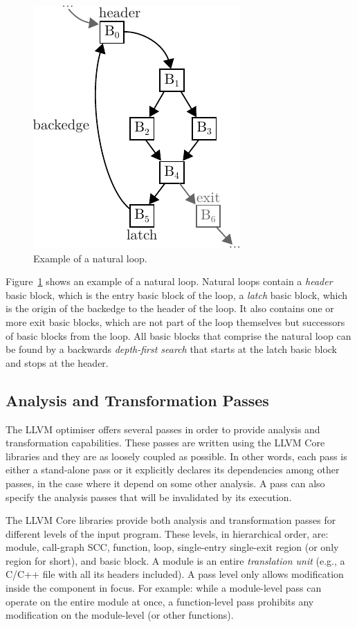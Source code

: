 \begin{figure}[h]
  \centering
  \includegraphics[scale=1]{figs/natural-loop.pdf}
  \caption{Example of a natural loop.}
  \label{fig:natural-loops}
\end{figure}

Figure~\ref{fig:natural-loops} shows an example of a natural loop.
Natural loops contain a \textit{header} basic block, which is the entry basic block of the loop,
a \textit{latch} basic block, which is the origin of the backedge to the header of the loop.
It also contains one or more exit basic blocks, which are not part of the loop themselves but successors of basic blocks from the loop.
All basic blocks that comprise the natural loop can be found by a backwards \textit{depth-first search} that starts at the latch basic block and stops at the header.
 
\subsection{Analysis and Transformation Passes}

The LLVM optimiser offers several passes in order to provide analysis and transformation capabilities.
These passes are written using the LLVM Core libraries and they are as loosely coupled as possible.
In other words, each pass is either a stand-alone pass or it explicitly declares its dependencies among other passes, in the case where it depend on some other analysis.
A pass can also specify the analysis passes that will be invalidated by its execution.

The LLVM Core libraries provide both analysis and transformation passes for different levels of the input program.
These levels, in hierarchical order, are: module, call-graph SCC, function, loop, single-entry single-exit region (or only region for short), and basic block.
A module is an entire \textit{translation unit} (e.g., a C/C++ file with all its headers included).
A pass level only allows modification inside the component in focus.
For example: while a module-level pass can operate on the entire module at once,
a function-level pass prohibits any modification on the module-level (or other functions).

